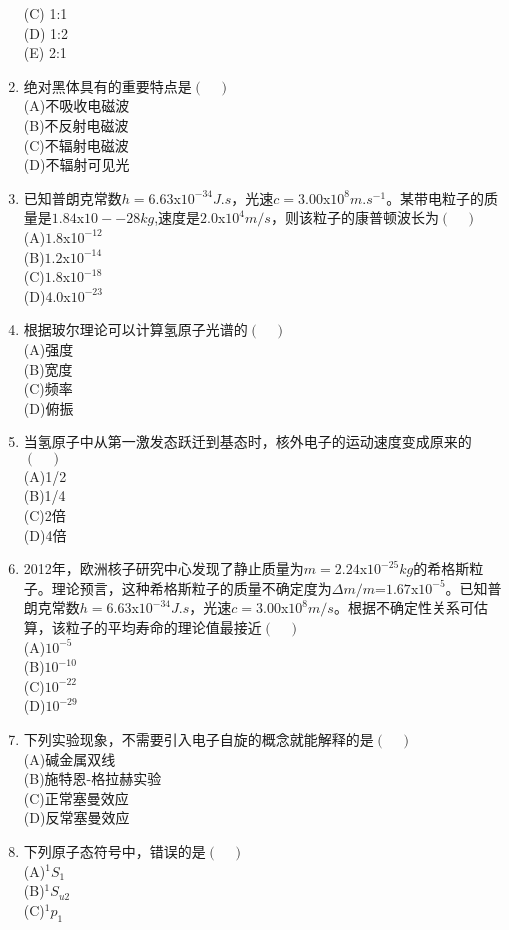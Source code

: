 \begin{enumerate}
(C) 1:1\\
(D) 1:2\\
(E) 2:1
\item 绝对黑体具有的重要特点是$(\quad)$\\
(A)不吸收电磁波\\
(B)不反射电磁波\\
(C)不辐射电磁波\\
(D)不辐射可见光
\item 已知普朗克常数$h=6.63$x$10^{-34}J.s$，光速$c=3.00$x$10^8m.s^{-1}$。某带电粒子的质量是$1.84$x$10-{-28}kg$,速度是$2.0$x$10^4 m/s$，则该粒子的康普顿波长为$(\quad)$\\
(A)$1.8$x1$0^{-12}$\\
(B)$1.2$x$10^{-14}$\\
(C)$1.8$x$10^{-18}$\\
(D)$4.0$x$10^{-23}$
\item 根据玻尔理论可以计算氢原子光谱的$(\quad)$\\
(A)强度\\
(B)宽度\\
(C)频率\\
(D)俯振
\item 当氢原子中从第一激发态跃迁到基态时，核外电子的运动速度变成原来的$(\quad)$\\
(A)1/2\\
(B)1/4\\
(C)2倍\\
(D)4倍
\item 2012年，欧洲核子研究中心发现了静止质量为$m=2.24$x$10^{-25}kg$的希格斯粒子。理论预言，这种希格斯粒子的质量不确定度为$\Delta m/m$=$1.67$x$10^{-5}$。已知普朗克常数$h=6.63$x$10^{-34}J.s$，光速$c=3.00$x$10^8 m/s$。根据不确定性关系可估算，该粒子的平均寿命的理论值最接近$(\quad)$\\
(A)$10^{-5}$\\
(B)$10^{-10}$\\
(C)$10^{-22}$\\
(D)$10^{-29}$
\item 下列实验现象，不需要引入电子自旋的概念就能解释的是$(\quad)$\\
(A)碱金属双线 \\
(B)施特恩-格拉赫实验\\
(C)正常塞曼效应\\
(D)反常塞曼效应
\item 下列原子态符号中，错误的是$(\quad)$\\
(A)$^1S_1$\\
(B)$^1S_{u2}$\\
(C)$^1p_1$\\

\end{enumerate}
